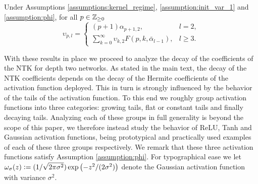 \begin{corollary} \label{corollary:upsilons_as_alphas}
Under Assumptions \ref{assumptions:kernel_regime}, \ref{assumption:init_var_1} and \ref{assumption:phi}, for all $p \in \mathbb{Z}_{\geq 0}$
\begin{equation}\label{eq:recurrence_Gdot_coeffs_simple}
        \upsilon_{p,l} = 
        \begin{cases}
            (p+1)\alpha_{p+1,2}, &l=2,\\
            \sum_{k=0}^{\infty} \upsilon_{k,2} F(p,k,\bar{\alpha}_{l-1}), &l\geq 3.
        \end{cases}
\end{equation}
\end{corollary}

With these results in place we proceed to analyze the decay of the coefficients of the NTK for depth two networks. As stated in the main text, the decay of the NTK coefficients depends on the decay of the Hermite coefficients of the activation function deployed. This in turn is strongly influenced by the behavior of the tails of the activation function. To this end we roughly group activation functions into three categories: growing tails, flat or constant tails and finally decaying tails. Analyzing each of these groups in full generality is beyond the scope of this paper, we therefore instead study the behavior of ReLU, Tanh and Gaussian activation functions, being prototypical and practically used examples of each of these three groups respectively. We remark that these three activation functions satisfy Assumption \ref{assumption:phi}. For typographical ease we let $\omega_{\sigma}(z) \vcentcolon= (1/\sqrt{2 \pi \sigma^2}) \exp\left( -z^2/ (2 \sigma^2)\right)$ denote the Gaussian activation function with variance $\sigma^2$.

\NTKcoeffTwolayer*

